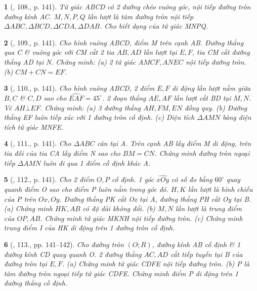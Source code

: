 \documentclass{article}
\newtheorem{baitoan}{}
\begin{document}
\begin{baitoan}[\cite{Tuyen_Toan_9_old}, 108., p. 141]
	Tứ giác ABCD có 2 đường chéo vuông góc, nội tiếp đường tròn đường kính AC. $M,N,P,Q$ lần lượt là tâm đường tròn nội tiếp $\Delta ABC,\Delta BCD,\Delta CDA,\Delta DAB$. Cho biết dạng của tứ giác MNPQ.
\end{baitoan}

\begin{baitoan}[\cite{Tuyen_Toan_9_old}, 109., p. 141]
	Cho hình vuông ABCD, điểm M trên cạnh AB. Đường thẳng qua C \& vuông góc với CM cắt 2 tia $AB,AD$ lần lượt tại $E,F$, tia CM cắt đường thẳng AD tại N. Chứng minh: (a) 2 tứ giác $AMCF,ANEC$ nội tiếp đường tròn. (b) $CM + CN = EF$.
\end{baitoan}

\begin{baitoan}[\cite{Tuyen_Toan_9_old}, 110., p. 141]
	Cho hình vuông ABCD, 2 điểm $E,F$ di động lần lượt nằm giữa $B,C$ \& $C,D$ sao cho $\widehat{EAF} = 45^\circ$. 2 đoạn thẳng $AE,AF$ lần lượt cắt BD tại $M,N$. Vẽ $AH\bot EF$. Chứng minh: (a) 3 đường thẳng $AH,FM,EN$ đồng quy. (b) Đường thẳng EF luôn tiếp xúc với 1 đường tròn cố định. (c) Diện tích $\Delta AMN$ bàng diện tích tứ giác MNFE.
\end{baitoan}

\begin{baitoan}[\cite{Tuyen_Toan_9_old}, 111., p. 141]
	Cho $\Delta ABC$ cân tại A. Trên cạnh AB lấy điểm M di động, trên tia đối của tia CA lấy điểm N sao cho $BM = CN$. Chứng minh đường tròn ngoại tiếp $\Delta AMN$ luôn đi qua 1 điểm cố định khác A.
\end{baitoan}

\begin{baitoan}[\cite{Tuyen_Toan_9_old}, 112., p. 141]
	Cho 2 điểm $O,P$ cố định. 1 góc $\widehat{xOy}$ có số đo bằng $60^\circ$ quay quanh điểm O sao cho điểm P luôn nằm trong góc đó. $H,K$ lần lượt là hình chiếu của P trên $Ox,Oy$. Đường thẳng PK cắt Ox tại A, đường thẳng PH cắt Oy tại B. (a) Chứng minh $HK,AB$ có độ dài không đổi. (b) $M,N$ lần lượt là trung điểm của $OP,AB$. Chứng minh tứ giác MKNH nội tiếp đường tròn. (c) Chứng minh trung điểm I của HK di động trên 1 đường tròn cố định.
\end{baitoan}

\begin{baitoan}[\cite{Tuyen_Toan_9_old}, 113., pp. 141--142]
	Cho đường tròn $(O;R)$, đường kính AB cố định \& 1 đường kính CD quay quanh O. 2 đường thẳng $AC,AD$ cắt tiếp tuyến tại B của đường tròn tại $E,F$. (a) Chứng minh tứ giác CDFE nội tiếp đường tròn. (b) P là tâm đường tròn ngoại tiếp tứ giác CDFE. Chứng minh điểm P di động trên 1 đường thẳng cố định.
\end{baitoan}
\end{document}
